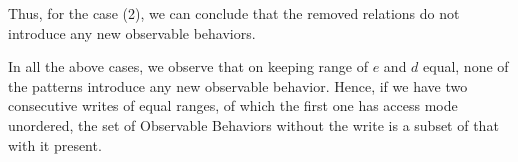     Thus, for the case (2), we can conclude that the removed relations do not introduce any new observable behaviors.

    In all the above cases, we observe that on keeping range of $e$ and $d$ equal, none of the patterns introduce any new observable behavior. Hence, if we have two consecutive writes of equal ranges, of which the first one has access mode unordered, the set of Observable Behaviors without the write is a subset of that with it present. 